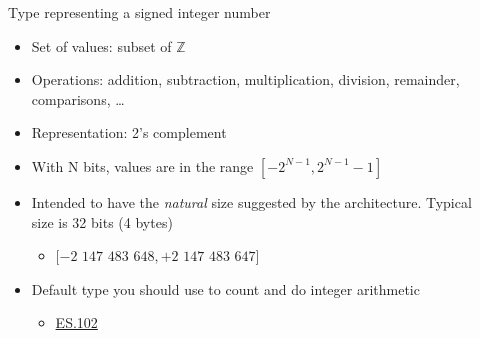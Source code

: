 \begin{frame}[fragile]{}

  \begin{columns}
    \begin{column}{.8\textwidth}
      Type representing a signed integer number

      \begin{itemize}
      \item<2-> Set of values: subset of $\mathbb{Z}$
      \item<3-> Operations: addition, subtraction, multiplication, division,
        remainder, comparisons, \ldots
      \item<4-> Representation: 2's complement
      \item<5-> With N bits, values are in the range $[-2^{N-1}, 2^{N-1}-1]$
      \item<6-> Intended to have the \textit{natural} size suggested by the
        architecture. Typical size is 32 bits (4 bytes)
        \begin{itemize}
        \item $[-2$ $147$ $483$ $648, +2$ $147$ $483$ $647]$
        \end{itemize}
      \item<7-> Default type you should use to count and do integer arithmetic
        \begin{itemize}
        \item \href{https://isocpp.github.io/CppCoreGuidelines/CppCoreGuidelines#es102-use-signed-types-for-arithmetic}{ES.102}
        \end{itemize}
      \end{itemize}
    \end{column}
    \hfill
    \begin{column}{.2\textwidth}
    \end{column}
  \end{columns}

\end{frame}

